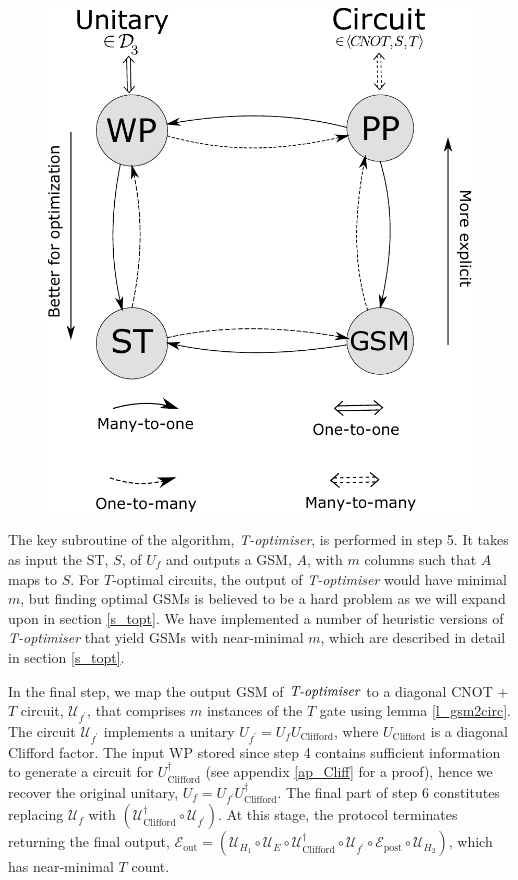 \documentclass[notitlepage]{article}
\theoremstyle{definition}
\theoremstyle{problem}
\theoremstyle{lemma}
\begin{document}
\begin{figure}
	\centering
	\includegraphics[width=1\linewidth]{maprep}
	\caption{}
	\label{fig_maprep}
\end{figure}

The key subroutine of the algorithm, \emph{T-optimiser}, is performed in step 5. It takes as input the ST, $S$, of $U_f$ and outputs a GSM, $A$, with $m$ columns such that $A$ maps to $S$. For $T$-optimal circuits, the output of \emph{T-optimiser} would have minimal $m$, but finding optimal GSMs is believed to be a hard problem as we will expand upon in section \ref{s_topt}. We have implemented a number of heuristic versions of \emph{T-optimiser} that yield GSMs with near-minimal $m$, which are described in detail in section \ref{s_topt}.

In the final step, we map the output GSM of $\emph{T-optimiser}$ to a diagonal CNOT + $T$ circuit, $\mathcal{U}_{f^\prime}$, that comprises $m$ instances of the $T$ gate using lemma \ref{l_gsm2circ}. The circuit $\mathcal{U}_{f^\prime}$ implements a unitary $U_{f^\prime}=U_fU_{\text{Clifford}}$, where $U_{\text{Clifford}}$ is a diagonal Clifford factor. The input WP stored since step 4 contains sufficient information to generate a circuit for $U_{\text{Clifford}}^\dagger$ (see appendix \ref{ap_Cliff} for a proof), hence we recover the original unitary, $U_f=U_{f^\prime} U_{\text{Clifford}}^\dagger$. The final part of step 6 constitutes replacing $\mathcal{U}_f$ with $(\mathcal{U}^\dagger_{\text{Clifford}}\circ\mathcal{U}_{f^\prime})$. At this stage, the protocol terminates returning the final output, $\mathcal{E}_{\text{out}} = (\mathcal{U}_{H_1}\circ \mathcal{U}_E \circ \mathcal{U}^\dagger_{\text{Clifford}}\circ\mathcal{U}_{f^\prime} \circ \mathcal{E}_{\text{post}}\circ \mathcal{U}_{H_2})$, which has near-minimal $T$ count.
\end{document}
